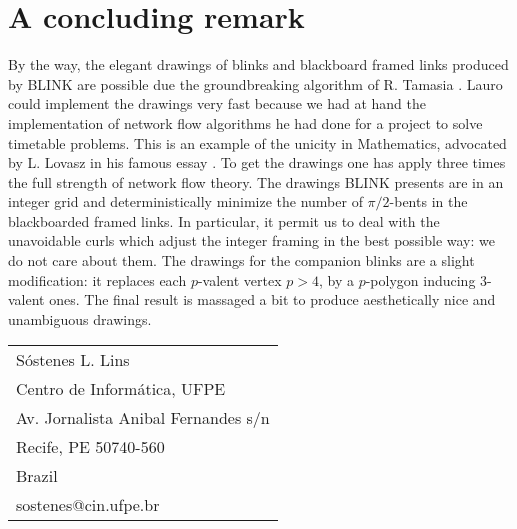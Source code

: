 
\section{A concluding remark}
By the way, the elegant drawings of blinks and blackboard framed links produced by BLINK are 
possible due the groundbreaking algorithm of R. Tamasia \cite{tamassia1987egg}.
Lauro could implement the drawings very fast because we had at hand the implementation of
network flow algorithms he had done for a project to solve timetable problems.
This is an example of the unicity in Mathematics, advocated by L. Lovasz in his famous essay \cite{lovasz1998om}.
To get the drawings one has apply three times the full strength of network flow theory.
The drawings BLINK presents are in an integer grid and 
deterministically minimize the number of $\pi/2$-bents in the blackboarded framed links.
In particular, it permit us to deal with the unavoidable curls which adjust the integer framing in
the best possible way: we do not care about them. 
The drawings for the companion blinks are a slight modification: it replaces each $p$-valent vertex $p>4$,
by a $p$-polygon inducing 3-valent ones. The final result is massaged a bit to
produce aesthetically nice and unambiguous drawings.



%
%

%


\vspace{5mm}
\begin{center}
\hspace{7mm}
\begin{tabular}{l}
   S\'ostenes L. Lins\\
   Centro de Inform\'atica, UFPE \\
   Av. Jornalista Anibal Fernandes s/n\\
   Recife, PE 50740-560 \\
   Brazil\\
   sostenes@cin.ufpe.br
\end{tabular}
\end{center}
